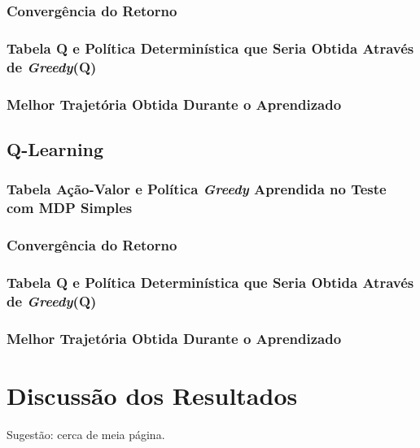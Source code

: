 \documentclass[brazil, 12pt]{article}
\begin{document}
\subsubsection{Convergência do Retorno}

\subsubsection{Tabela Q e Política Determinística que Seria Obtida Através de \emph{Greedy}(Q)}

\subsubsection{Melhor Trajetória Obtida Durante o Aprendizado}

\subsection{Q-Learning}

\subsubsection{Tabela Ação-Valor e Política \emph{Greedy} Aprendida no Teste com MDP Simples}

\subsubsection{Convergência do Retorno}

\subsubsection{Tabela Q e Política Determinística que Seria Obtida Através de \emph{Greedy}(Q)}

\subsubsection{Melhor Trajetória Obtida Durante o Aprendizado }

\section{Discussão dos Resultados}
Sugestão: cerca de meia página.
\end{document}
